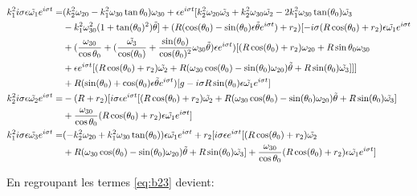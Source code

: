 \begin{align}
    k_1^2 i \sigma \epsilon \Tilde{\omega_1} e^{i \sigma t} =&(k_2^2\omega_{20}-k_1^2\omega_{30} \tan{\theta_0})\omega_{30}+\epsilon e^{i\sigma t}[k_2^2 \omega_{20} \tilde{\omega_3}+k_2^2 \omega_{30} \tilde{\omega_2} -2k_1^2\omega_{30} \tan(\theta_0)\tilde{\omega_3}\nonumber\\
    &-k_1^2 \omega_{30}^2(1+\tan(\theta_0)^2)\tilde{\theta} ]+(R(\cos(\theta_0)- \sin(\theta_0)\epsilon \Tilde{\theta} e^{i \sigma t})+r_2)[-i \sigma( R\cos(\theta_0)+r_2)\epsilon \Tilde{\omega_1} e^{i \sigma t} \nonumber\\
    &+ (\frac{\omega_{30}}{\cos{\theta_0}} + (\frac{\tilde{\omega_3}}{\cos(\theta_0)}+\frac{\sin(\theta_0)}{\cos(\theta_0)^2}\omega_{30}\tilde{\theta})\epsilon e^{i \sigma t}) [(R\cos(\theta_0)+r_2)\omega_{20}+R \sin{\theta_0}\omega_{30} \nonumber\\ 
    &+ \epsilon e^{i \sigma t}[(R\cos(\theta_0)+r_2) \Tilde{\omega_2} +R(\omega_{30}\cos(\theta_0)-\sin(\theta_0)\omega_{20}) \Tilde{\theta}+R\sin(\theta_0) \Tilde{\omega_3} ] ]] \nonumber\\
    &+ R(\sin(\theta_0)+ \cos(\theta_0)\epsilon \Tilde{\theta} e^{i \sigma t})[g-i \sigma R \sin(\theta_0)\epsilon \Tilde{\omega_1} e^{i \sigma t}] \nonumber\\
    k_2^2 i \sigma\epsilon \Tilde{\omega_2} e^{i \sigma t}=&-(R+r_2) [i \sigma \epsilon e^{i \sigma t}[(R\cos(\theta_0)+r_2) \Tilde{\omega_2} +R(\omega_{30}\cos(\theta_0)-\sin(\theta_0)\omega_{20}) \Tilde{\theta}+R\sin(\theta_0) \Tilde{\omega_3} ] \nonumber\\
    &+\frac{\omega_{30}}{\cos{\theta_0}} (R\cos(\theta_0)+r_2)\epsilon \Tilde{\omega_1} e^{i \sigma t}] \nonumber\\
    k_1^2 i \sigma\epsilon \Tilde{\omega_3} e^{i \sigma t}=&(-k_2^2\omega_{20}+k_1^2\omega_{30} \tan(\theta_0))\epsilon \Tilde{\omega_1} e^{i \sigma t} + r_2 [i \sigma \epsilon e^{i \sigma t}[(R\cos(\theta_0)+r_2) \Tilde{\omega_2} \nonumber\\
    &+R(\omega_{30}\cos(\theta_0)-\sin(\theta_0)\omega_{20}) \Tilde{\theta}+R\sin(\theta_0) \Tilde{\omega_3} ] 
    +\frac{\omega_{30}}{\cos{\theta_0}} (R\cos(\theta_0)+r_2)\epsilon \Tilde{\omega_1} e^{i \sigma t}]
\label{eq:b23}
\end{align}


En regroupant les termes \ref{eq:b23} devient:

